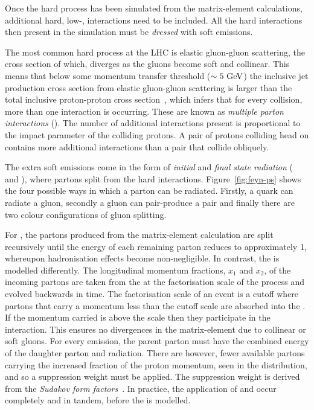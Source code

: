 Once the hard process has been simulated from the matrix-element calculations, additional hard, low-\pt{}, interactions need to be included. 
All the hard interactions then present in the simulation must be \textit{dressed} with soft emissions.

The most common hard process at the LHC is elastic gluon-gluon scattering, the cross section of which, diverges as the gluons become soft and collinear.
This means that below some momentum transfer threshold ($\sim5\mathrm{~Ge\hspace{-.08em}V}^{}$) the inclusive jet production cross section from elastic gluon-gluon scattering is larger than the total inclusive proton-proton cross section~\cite{Gen:MPI_1, Gen:MPI_2}, which infers that for every collision, more than one interaction is occurring.
These are known as \textit{multiple parton interactions} (\MPI{}).
The number of additional interactions present is proportional to the impact parameter of the colliding protons.
A pair of protons colliding head on contains more additional interactions than a pair that collide obliquely.

The extra soft emissions come in the form of \textit{initial} and \textit{final state radiation} (\ISR{} and \FSR{}), where partons split from the hard interactions.
Figure~\ref{fig:feyn-ps} shows the four possible ways in which a parton can be radiated.
Firstly, a quark can radiate a gluon, secondly a gluon can pair-produce a \qqbar{} pair and finally there are two colour configurations of gluon splitting.


For \FSR{}, the partons produced from the matrix-element calculation are split recursively until the energy of each remaining parton reduces to approximately 1\GeV{}, whereupon hadronisation effects become non-negligible.
In contrast, the \ISR{} is modelled differently.
The longitudinal momentum fractions, $x_1$ and $x_2$, of the incoming partons are taken from the \PDF{} at the factorisation scale of the process and evolved backwards in time. 
The factorisation scale of an event is a cutoff where partons that carry a momentum less than the cutoff scale are absorbed into the \PDF{}.
If the momentum carried is above the scale then they participate in the interaction.
This ensures no divergences in the matrix-element due to collinear or soft gluons.
For every \ISR{} emission, the parent parton must have the combined energy of the daughter parton and radiation.
There are however, fewer available partons carrying the increased fraction of the proton momentum, seen in the \PDF{} distribution, and so a suppression weight must be applied.
The suppression weight is derived from the \textit{Sudakov form factors}~\cite{Gen:Sudokov}.
In practice, the application of \ISR{} and \MPI{} occur completely and in tandem, before the \FSR{} is modelled.

